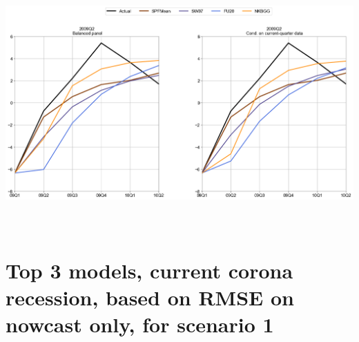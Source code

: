 \documentclass{article}
\begin{document}
\includegraphics[scale=0.5]{Top3_models_2009Q2}\\ \bigskip \\ \bigskip  \\

\pagebreak
\section{\Large Top 3 models, current corona recession, based on RMSE on nowcast only, for scenario 1}
\end{document}
